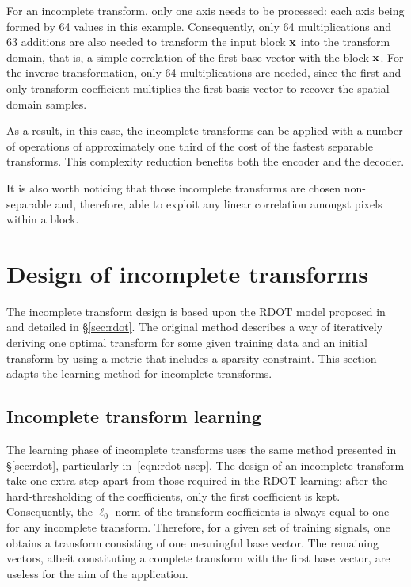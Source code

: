 \documentclass[11pt,a4paper,openright,twoside]{book}
\numberwithin{equation}{section} %
\numberwithin{figure}{section} %
\numberwithin{table}{section} %
\begin{document}
For an incomplete transform, only one axis needs to be processed:
each axis being formed by 64 values in this example.
Consequently, only 64 multiplications and 63 additions are also needed to
transform the input block $\mathbf{x}$ into the transform domain, that is, a simple
correlation of the first base vector with the block $\mathbf{x}$.
For the inverse transformation, only 64 multiplications are needed, since the
first and only transform coefficient multiplies the first basis vector to
recover the spatial domain samples.

As a result, in this case, the incomplete transforms can be applied with a
number of operations of approximately one third of the cost of the fastest
separable transforms.
This complexity reduction benefits both the encoder and the decoder.

It is also worth noticing that those incomplete transforms are chosen
non-separable and, therefore, able to exploit any linear correlation amongst
pixels within a block.

\section{Design of incomplete transforms}
\label{sec:it_design_of_incomplete_transforms}

The incomplete transform design is based upon the \ac{RDOT} model proposed
in~\cite{sezer-08-sparse-orthonormal-transforms} and detailed in
\S\ref{sec:rdot}.
The original method describes a way of iteratively deriving one optimal
transform for some given training data and an initial transform by using a
metric that includes a sparsity constraint.
This section adapts the learning method for incomplete transforms.

\subsection{Incomplete transform learning}
\label{sub:it_incomplete_transform_learning}

The learning phase of incomplete transforms uses the same method presented in
\S\ref{sec:rdot}, particularly in~\eqref{eqn:rdot-nsep}.
The design of an incomplete transform take one extra step apart from those
required in the \ac{RDOT} learning:
after the hard-thresholding of the coefficients, only the first coefficient is
kept.
Consequently, the $\ell_0$ norm of the transform coefficients is always equal
to one for any incomplete transform.
Therefore, for a given set of training signals, one obtains a transform
consisting of one meaningful base vector.
The remaining vectors, albeit constituting a complete transform with the first
base vector, are useless for the aim of the application.
\end{document}
